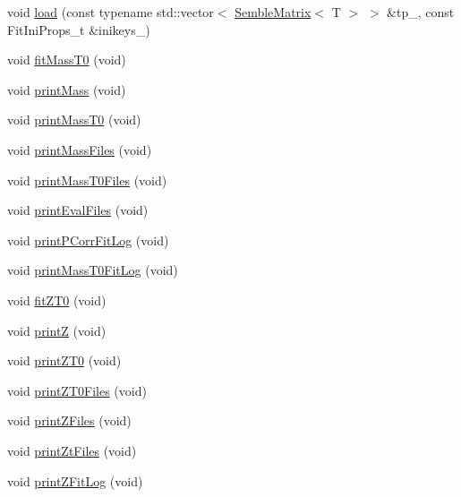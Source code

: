 \begin{DoxyCompactItemize}
void \mbox{\hyperlink{structSEMBLE_1_1SMT0Fit_a082e12f3695d20ca6acb97d221c30ad1}{load}} (const typename std\+::vector$<$ \mbox{\hyperlink{structSEMBLE_1_1SembleMatrix}{Semble\+Matrix}}$<$ T $>$ $>$ \&tp\+\_\+, const Fit\+Ini\+Props\+\_\+t \&inikeys\+\_\+)
\item 
void \mbox{\hyperlink{structSEMBLE_1_1SMT0Fit_aeeb6d36dda0c5fae9e4bae185f8fadd9}{fit\+Mass\+T0}} (void)
\item 
void \mbox{\hyperlink{structSEMBLE_1_1SMT0Fit_af74d4bc3a5a2da2fa8cd263558acf71a}{print\+Mass}} (void)
\item 
void \mbox{\hyperlink{structSEMBLE_1_1SMT0Fit_a7c2e4c02b18c8566b7609c9f58d467ee}{print\+Mass\+T0}} (void)
\item 
void \mbox{\hyperlink{structSEMBLE_1_1SMT0Fit_a245820fe812f284ef650ae5b1d38a51c}{print\+Mass\+Files}} (void)
\item 
void \mbox{\hyperlink{structSEMBLE_1_1SMT0Fit_a4143346724c18fdd7e82f34f585ed11d}{print\+Mass\+T0\+Files}} (void)
\item 
void \mbox{\hyperlink{structSEMBLE_1_1SMT0Fit_a8d1f484b9943116a221db5955d27bb30}{print\+Eval\+Files}} (void)
\item 
void \mbox{\hyperlink{structSEMBLE_1_1SMT0Fit_a7553e4903f0646d0382dd9335cee52be}{print\+P\+Corr\+Fit\+Log}} (void)
\item 
void \mbox{\hyperlink{structSEMBLE_1_1SMT0Fit_acfb1bcb9dbae9eb752ca05769ab0caa4}{print\+Mass\+T0\+Fit\+Log}} (void)
\item 
void \mbox{\hyperlink{structSEMBLE_1_1SMT0Fit_aae2f42a0b663e58a7458dee2b7a954f2}{fit\+Z\+T0}} (void)
\item 
void \mbox{\hyperlink{structSEMBLE_1_1SMT0Fit_a6bea5ac00bfbb4338655f60bc936c59a}{printZ}} (void)
\item 
void \mbox{\hyperlink{structSEMBLE_1_1SMT0Fit_a3736fc1b96ef2088b5f1235b919010d7}{print\+Z\+T0}} (void)
\item 
void \mbox{\hyperlink{structSEMBLE_1_1SMT0Fit_a503743e09b5c5f01d6b568dbd5d1ab5a}{print\+Z\+T0\+Files}} (void)
\item 
void \mbox{\hyperlink{structSEMBLE_1_1SMT0Fit_ad9381bac6df9a9ba07f13dac7316b56a}{print\+Z\+Files}} (void)
\item 
void \mbox{\hyperlink{structSEMBLE_1_1SMT0Fit_ab63a7af0133bf01ef5780d4030eac5c7}{print\+Zt\+Files}} (void)
\item 
void \mbox{\hyperlink{structSEMBLE_1_1SMT0Fit_ac05aeb4146f537a4e956de7ed302a056}{print\+Z\+Fit\+Log}} (void)
\item 

\end{DoxyCompactItemize}
